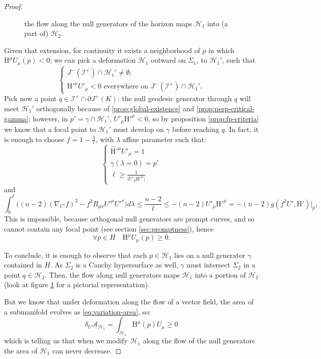 \begin{proof}
\begin{figure}
		\caption[]{the flow along the null generators of the horizon maps \(\mathscr{H}_1\) into (a part of) \(\mathscr{H}_2\).}
		\label{fig:flow-generators}
	\end{figure}
	Given that extension, for continuity it exists a neighborhood of \(p\) in which \(\mathrm{H}^{\mu}U_{\mu}(p) < 0\); we can pick a deformation \(\mathscr{H}_1\) outward on \(\Sigma_1\), to \(\mathscr{H}_1'\), such that
	\[
	\begin{cases}
	J^-(\mathscr{I}^+) \cap \mathscr{H}_1' \neq \emptyset; \\
	\mathrm{H}'^{\mu}U'_{\mu} < 0 \text{ everywhere on } 	J^-(\mathscr{I}^+) \cap \mathscr{H}_1'.
	\end{cases}
	\]
	Pick now a point \(q \in \mathscr{I}^+ \cap \partial J^+(K)\):  
	the null geodesic generator through \(q\) will meet \(\mathscr{H}_1'\) orthogonally because of \ref{prop:global-existence} and \ref{prop:perp-critical-gamma}; however, in \(p' = \gamma \cap \mathscr{H}_1'\), \(U'_{\mu}\mathrm{H}'^{\mu} < 0\), so by proposition \ref{prop:fp-criteria} we know that a focal point to \(\mathscr{H}_1'\) must develop on \(\gamma\) before reaching \(q\). In fact, it is enough to choose \(f = 1 - \frac{\lambda}{\ell}\), with \(\lambda\) affine parameter such that:
	\[
	\begin{cases}
	\hat{\mathrm{H}}'^{\mu}U'_{\mu} = 1 \\
	\gamma(\lambda = 0) = p' \\
	\ell \ge  \frac{1}{\vert U'_{\mu}\mathrm{H}'^{\mu} \vert}
	\end{cases}
	\]
	and 
	{\small
	\[
	\int_{0}^{\ell} \big((n -2)(\nabla_{U'}f)^2 - f^2R_{\mu\nu}U'^{\mu}U'^{\nu} \big)d\lambda\le 
	\frac{n -2}{\ell} \le -(n -2) U'_{\mu} \mathrm{H}'^{\mu} =
	-(n -2) g(f^2 U', \mathrm{H}')\Big\vert_{p},
	\]}
	This is impossible, because orthogonal null generators are prompt curves, and so cannot contain any focal point (see section \ref{sec:promptness}), hence 
	\[
	\forall p \in H \quad \mathrm{H}^{\mu}U_{\mu}(p) \ge 0.
	\]
		
	To conclude, it is enough to observe that each \(p\in \mathscr{H}_1\) lies on a null generator \(\gamma\) contained in \(H\). As \(\Sigma_2\) is a Cauchy hypersurface as well, \(\gamma\) must intersect \(\Sigma_2\) in a point \(q \in \mathscr{H}_2\). Then, the flow along null generators maps \(\mathscr{H}_1\) into a portion of \(\mathscr{H}_2\) (look at figure 
	\ref{fig:flow-generators} for a pictorial representation).
	
	But we know that under deformation along the flow of a vector field, the area of a submanifold evolves as \eqref{eq:variation-area}, so:
	\begin{equation*}
		\delta_U\mathcal{A}_{\mathscr{H}_1} = \int_{\mathscr{H}_1} \mathrm{H}^{\mu}(p)U_{\mu} \ge 0
	\end{equation*}
	which is telling us that when we modify \(\mathscr{H}_1\) along the flow of the null generators the area of \(\mathscr{H}_1\) can never decrease.
\end{proof}


